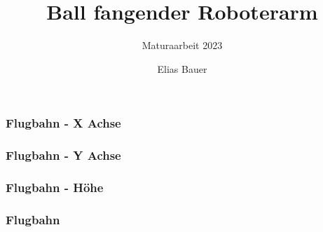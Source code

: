 \documentclass[aspectratio=169]{beamer}
\title {Ball fangender Roboterarm}
\date[Maturaarbeit]{}
\subtitle{Maturaarbeit 2023}
\author{Elias Bauer}
\institute{Kollegium St. Fidelis}
\begin{document}
\frame[plain]{\titlepage}


\begin{frame}
	\frametitle{Flugbahn - X Achse}

	\FlightPathX

\end{frame}

\begin{frame}
	\frametitle{Flugbahn - Y Achse}

	\FlightPathY

\end{frame}

\begin{frame}
	\frametitle{Flugbahn - Höhe}

	\FlightPathZ

\end{frame}

\begin{frame}
	\frametitle{Flugbahn}

	\FlightPath

\end{frame}






\end{document}
